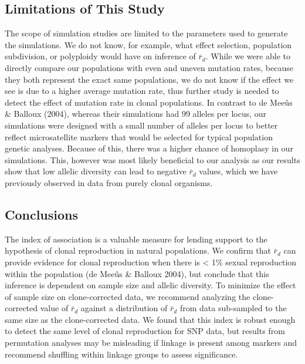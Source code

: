 \documentclass[]{article}
\theoremstyle{definition}
\theoremstyle{definition}
\theoremstyle{remark}
\begin{document}
\subsection{Limitations of This Study}\label{limitations-of-this-study}

The scope of simulation studies are limited to the parameters used to
generate the simulations. We do not know, for example, what effect
selection, population subdivision, or polyploidy would have on inference
of \(\bar{r}_d\). While we were able to directly compare our populations
with even and uneven mutation rates, because they both represent the
exact same populations, we do not know if the effect we see is due to a
higher average mutation rate, thus further study is needed to detect the
effect of mutation rate in clonal populations. In contrast to de Meeûs
\& Balloux (2004), whereas their simulations had 99 alleles per locus,
our simulations were designed with a small number of alleles per locus
to better reflect microsatellite markers that would be selected for
typical population genetic analyses. Because of this, there was a higher
chance of homoplasy in our simulations. This, however was most likely
beneficial to our analysis as our results show that low allelic
diversity can lead to negative \(\bar{r}_d\) values, which we have
previously observed in data from purely clonal organisms.

\subsection{Conclusions}\label{conclusions}

The index of association is a valuable measure for lending support to
the hypothesis of clonal reproduction in natural populations. We confirm
that \(\bar{r}_d\) can provide evidence for clonal reproduction when
there is \textless{} 1\% sexual reproduction within the population (de
Meeûs \& Balloux 2004), but conclude that this inference is dependent on
sample size and allelic diversity. To minimize the effect of sample size
on clone-corrected data, we recommend analyzing the clone-corrected
value of \(\bar{r}_d\) against a distribution of \(\bar{r}_d\) from data
sub-sampled to the same size as the clone-corrected data. We found that
this index is robust enough to detect the same level of clonal
reproduction for SNP data, but results from permutation analyses may be
misleading if linkage is present among markers and recommend shuffling
within linkage groups to assess significance.
\end{document}

